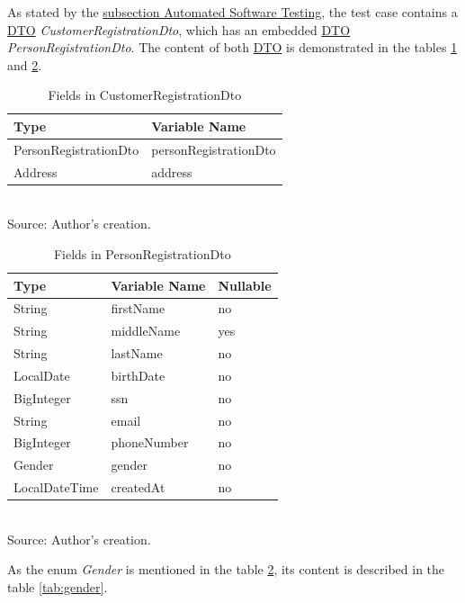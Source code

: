 As stated by the \hyperref[subsection:automated_software_testing]{subsection Automated Software Testing}, the test case contains a \hyperref[appendix:glossary]{DTO} \textit{CustomerRegistrationDto}, which has an embedded \hyperref[appendix:glossary]{DTO} \textit{PersonRegistrationDto}. The content of both \hyperref[appendix:glossary]{DTO} is demonstrated in the tables \ref{tab:customer_registration_dto} and \ref{tab:person_registration_dto}.

\begin{table}[H]
	\centering
	\caption{Fields in CustomerRegistrationDto}
	\begin{tabular}{ll}
		\toprule
		\textbf{Type} & \textbf{Variable Name} \\
		\midrule
		PersonRegistrationDto & personRegistrationDto \\ \hline
		Address & address \\
		\bottomrule
	\end{tabular}
	\\ \footnotesize Source: Author's creation.
	\label{tab:customer_registration_dto}
\end{table}

\begin{table}[H]
	\centering
	\caption{Fields in PersonRegistrationDto}
	\begin{tabular}{lll}
		\toprule
		\textbf{Type} & \textbf{Variable Name} & \textbf{Nullable} \\
		\midrule
		String & firstName & no \\ \hline
		String & middleName & yes \\ \hline
		String & lastName & no \\ \hline
		LocalDate & birthDate & no \\ \hline
		BigInteger & ssn & no \\ \hline
		String & email & no \\ \hline
		BigInteger & phoneNumber & no \\ \hline
		Gender & gender & no \\ \hline
		LocalDateTime & createdAt & no \\
		\bottomrule
	\end{tabular}
	\\ \footnotesize Source: Author's creation.
	\label{tab:person_registration_dto}
\end{table}

As the enum \textit{Gender} is mentioned in the table \ref{tab:person_registration_dto}, its content is described in the table \ref{tab:gender}.

